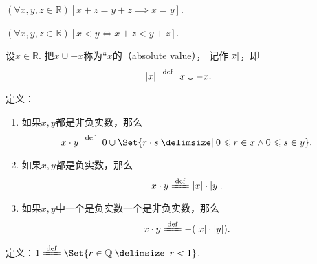 \begin{corollary}\label{theorem:集合论.实数的消去律}
\((\forall x,y,z\in\mathbb{R})[
	x+z=y+z \implies x=y
]\).
\end{corollary}

\begin{theorem}\label{theorem:集合论.实数的加法的保序性}
\((\forall x,y,z\in\mathbb{R})[
	x<y \iff x+z<y+z
]\).
\end{theorem}

\begin{definition}
设\(x\in\mathbb{R}\).
把\(x \cup -x\)称为“\(x\)的（absolute value），
记作\(\abs{x}\)，即\[
	\abs{x} \defeq x \cup -x.
\]
\end{definition}

\begin{definition}
定义：
\begin{enumerate}
	\item 如果\(x,y\)都是非负实数，那么\[
		x \cdot y
		\defeq
		0 \cup \Set{ r \cdot s \given 0 \leqslant r \in x \land 0 \leqslant s \in y }.
	\]

	\item 如果\(x,y\)都是负实数，那么\[
		x \cdot y \defeq \abs{x} \cdot \abs{y}.
	\]

	\item 如果\(x,y\)中一个是负实数一个是非负实数，那么\[
		x \cdot y \defeq -(\abs{x} \cdot \abs{y}).
	\]
\end{enumerate}
\end{definition}

\begin{definition}
定义：\(1\defeq\Set{ r\in\mathbb{Q} \given r < 1 }\).
\end{definition}

